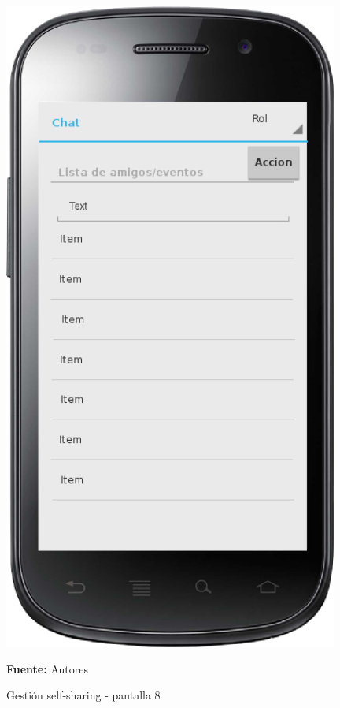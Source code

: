 \begin{figure}[!htb]
  \begin{center}
    \includegraphics[width=11cm]{./imagenes/UI/Self_sharing/self_sharing_8.png}
    \caption{Gestión self-sharing - pantalla 8}
    \label{fig:self_sharing_8}
    \textbf{Fuente:}  Autores
  \end{center}
\end{figure}

